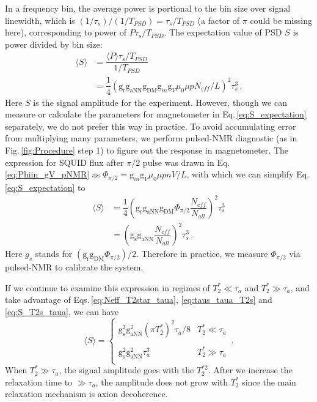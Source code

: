 In a frequency bin, the average power is portional to the bin size over signal linewidth, which is $(1/\tau_s)/(1/T_{PSD}) = \tau_s/T_{PSD}$ (a factor of $\pi$ could be missing here), corresponding to power of $P \tau_s/T_{PSD}$. The expectation value of PSD $S$ is power divided by bin size:
\begin{align}
    \langle S \rangle &= \dfrac{\langle P \rangle \tau_s/T_{PSD}}{1/T_{PSD}} \\
    & = \dfrac{1}{4} (\mathrm{g_{r}} \mathrm{g_{aNN}} \mathrm{g_{DM}} \mathrm{g}_{in} \mathrm{g}_{V} \mu_0 \mu p  N_{eff}/ L )^2  \tau_s^3 \,. \label{eq:S_expectation}
\end{align}
Here $S$ is the signal amplitude for the experiment. 
However, though we can measure or calculate the parameters for magnetometer in Eq.\,\eqref{eq:S_expectation} separately, we do not prefer this way in practice. To avoid accumulating error from multiplying many parameters, we perform pulsed-NMR diagnostic (as in Fig.\,\ref{fig:Procedure} step 1) to figure out the response in magnetometer. The expression for SQUID flux after $\pi/2$ pulse was drawn in Eq.\,\eqref{eq:Phiin_gV_pNMR} as $\Phi_{\pi/2} = \mathrm{g}_{in} \mathrm{g}_V \mu_0 \mu p n V / L$, with which we can simplify Eq.\,\eqref{eq:S_expectation} to
\begin{align}
    \langle S \rangle
    & = \dfrac{1}{4} \left(\mathrm{g_{r}} \mathrm{g_{aNN}}  \mathrm{g_{DM}} \Phi_{\pi/2} 
     \dfrac{N_{eff}}{N_{all}}\right)^2 \tau_s^3  \\ 
    & = \left(\mathrm{g_{s}}  \mathrm{g_{aNN}} \dfrac{N_{eff}}{N_{all}}\right)^2 \tau_s^3 \,. 
    \label{eq:S_T2s_taua}
\end{align}
Here $g_s$ stands for $ (\mathrm{g_{r}} \mathrm{g_{DM}}  \Phi_{\pi/2}) /2$.  
Therefore in practice, we measure $\Phi_{\pi/2}$ via pulsed-NMR to calibrate the system. 

If we continue to examine this expression in regimes of $T_2^* \ll \tau_a$ and $T_2^* \gg \tau_a$, and take advantage of Eqs.\,\eqref{eq:Neff_T2star_taua}, \eqref{eq:taus_taua_T2s} and \eqref{eq:S_T2s_taua}, we can have
\begin{equation}
    \langle S \rangle = \left\{
    \begin{array}{cl}
    \mathrm{g_{s}^2}    \mathrm{g_{aNN}^2} (\pi T_2^*)^2  \tau_a  /8 &  T_2^* \ll \tau_a\\
     & \\
    \mathrm{g_{s}^2}    \mathrm{g_{aNN}^2}  \tau_a^3  & T_2^* \gg \tau_a\\
    \end{array} \right.\,.%
\end{equation}
When $T_2^* \gg \tau_a$, the signal amplitude goes with the $T_2^{*2}$. 
After we increase the relaxation time to $\gg \tau_a$, the amplitude does not grow with $T_2^*$ since the main relaxation mechanism is axion decoherence. 


